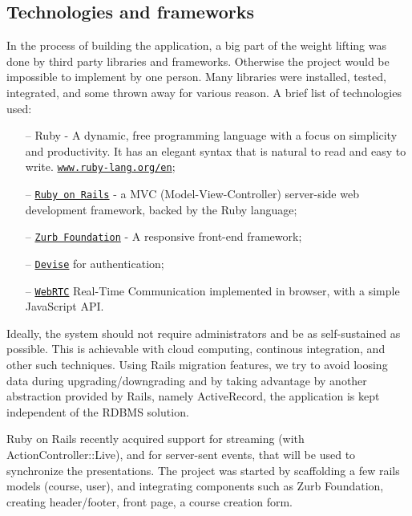 \subsection{Technologies and frameworks}
In the process of building the application, a big part of the weight lifting was done by third
party libraries and frameworks. Otherwise the project would be impossible to implement by
one person. Many libraries were installed, tested, integrated, and some thrown away for
various reason.
A brief list of technologies used:
\begin{enumerate}[topsep=5pt, partopsep=0pt,itemsep=3pt,parsep=1pt]
    \item[--] Ruby - A dynamic, free programming language with a focus on
        simplicity and productivity.
        It has an elegant syntax that is natural to read and easy to write.
        \href{https://wwww.ruby-lang.org/en/}{\texttt{www.ruby-lang.org/en}};
    \item[--] \href{http://rubyonrails.org}{\texttt{Ruby on Rails}} - a MVC
        (Model-View-Controller) server-side web development framework, backed by
        the Ruby language;
    \item[--] \href{http://foundation.zurb.com/}{\texttt{Zurb Foundation}} - A
        responsive front-end framework;
    \item[--] \href{https://github.com/plataformatec/devise}{\texttt{Devise}} for
        authentication;
    \item[--] \href{http://www.webrtc.org/}{\texttt{WebRTC}} Real-Time Communication
        implemented in browser, with a simple JavaScript API.
\end{enumerate}

Ideally, the system should not require administrators and be as self-sustained as possible.
This is achievable with cloud computing, continous integration, and other such techniques.
Using Rails migration features, we try to avoid loosing data during upgrading/downgrading and
by taking advantage by another abstraction provided by Rails, namely ActiveRecord, the application
is kept independent of the RDBMS solution.

Ruby on Rails recently acquired support for streaming (with ActionController::Live),
and for server-sent events, that will be used to synchronize the presentations.
The project was started by scaffolding a few rails models (course, user), and
integrating components such as Zurb Foundation, creating header/footer, front
page, a course creation form.

